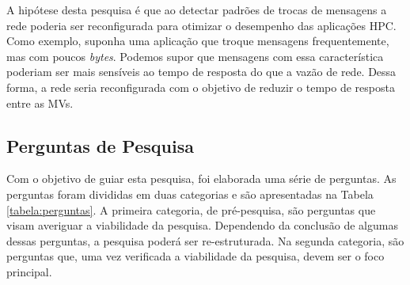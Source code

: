 \documentclass[10pt, conference, compsocconf]{IEEEtran}
\begin{document}
A hipótese desta pesquisa é que ao detectar padrões de trocas de mensagens a rede poderia ser reconfigurada para otimizar o desempenho das aplicações HPC. Como exemplo, suponha uma aplicação que troque mensagens frequentemente, mas com poucos \textit{bytes}. Podemos supor que mensagens com essa característica poderiam ser mais sensíveis ao tempo de resposta do que a vazão de rede. Dessa forma, a rede seria reconfigurada com o objetivo de reduzir o tempo de resposta entre as MVs. 

\subsection{Perguntas de Pesquisa}

Com o objetivo de guiar esta pesquisa, foi elaborada uma série de perguntas. As perguntas foram divididas em duas categorias e são apresentadas na Tabela \ref{tabela:perguntas}. A primeira categoria, de pré-pesquisa, são perguntas que visam averiguar a viabilidade da pesquisa. Dependendo da conclusão de algumas dessas perguntas, a pesquisa poderá ser re-estruturada. Na segunda categoria, são perguntas que, uma vez verificada a viabilidade da pesquisa, devem ser o foco principal.
\end{document}
